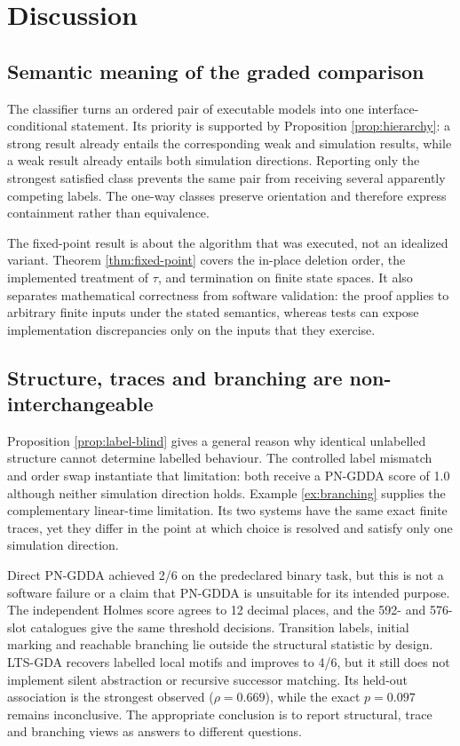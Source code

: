 \documentclass[JMCS,submit]{resources/ISRP}
\theoremstyle{definition}
\theoremstyle{remark}
\numberwithin{equation}{section}
\newcommand{\TAU}{\tau}
\begin{document}
\section{Discussion}\label{sec:discussion}

\subsection{Semantic meaning of the graded comparison}
\label{sec:discussion-meaning}

The classifier turns an ordered pair of executable models into one
interface-conditional statement. Its priority is supported by Proposition
\ref{prop:hierarchy}: a strong result already entails the corresponding weak and
simulation results, while a weak result already entails both simulation
directions. Reporting only the strongest satisfied class prevents the same pair
from receiving several apparently competing labels. The one-way classes preserve
orientation and therefore express containment rather than equivalence.

The fixed-point result is about the algorithm that was executed, not an idealized
variant. Theorem \ref{thm:fixed-point} covers the in-place deletion order, the
implemented treatment of $\TAU$, and termination on finite state spaces. It also
separates mathematical correctness from software validation: the proof applies
to arbitrary finite inputs under the stated semantics, whereas tests can expose
implementation discrepancies only on the inputs that they exercise.

\subsection{Structure, traces and branching are non-interchangeable}
\label{sec:discussion-layers}

Proposition \ref{prop:label-blind} gives a general reason why identical
unlabelled structure cannot determine labelled behaviour. The controlled label
mismatch and order swap instantiate that limitation: both receive a PN-GDDA
score of 1.0 although neither simulation direction holds. Example
\ref{ex:branching} supplies the complementary linear-time limitation. Its two
systems have the same exact finite traces, yet they differ in the point at which
choice is resolved and satisfy only one simulation direction.

Direct PN-GDDA achieved 2/6 on the predeclared binary task, but this is not a
software failure or a claim that PN-GDDA is unsuitable for its intended purpose.
The independent Holmes score agrees to 12 decimal places, and the 592- and
576-slot catalogues give the same threshold decisions. Transition labels,
initial marking and reachable branching lie outside the structural statistic by
design. LTS-GDA recovers labelled local motifs and improves to 4/6, but it still
does not implement silent abstraction or recursive successor matching. Its
held-out association is the strongest observed ($\rho=0.669$), while the exact
$p=0.097$ remains inconclusive. The appropriate conclusion is to report
structural, trace and branching views as answers to different questions.
\end{document}
